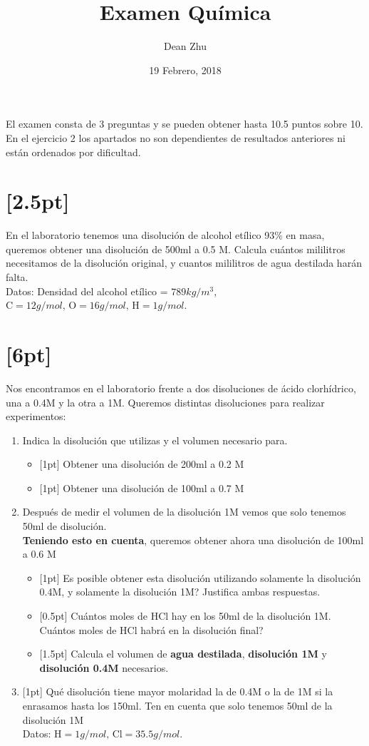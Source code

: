\documentclass[11pt]{article}
\date{19 Febrero, 2018}
\title{Examen Química}
\author{Dean Zhu}
\begin{document}
\maketitle
\thispagestyle{empty}
El examen consta de 3 preguntas y se pueden obtener hasta 10.5 puntos sobre 10. En el ejercicio 2 los apartados no son dependientes de resultados anteriores ni están ordenados por dificultad. 
\section{[2.5pt]}
\label{sec:org220dcd1}
En el laboratorio tenemos una disolución de alcohol etílico 93\% en masa, queremos obtener una disolución de 500ml a 0.5 M. Calcula cuántos mililitros necesitamos de la disolución original, y cuantos mililitros de agua destilada harán falta. \\
Datos: Densidad del alcohol etílico = \(789kg/m^{3}\), \(\text{C} = 12g/mol \text{, O} = 16g/mol \text{, H} = 1g/mol \).

\section{[6pt]}
\label{sec:org466d254}
Nos encontramos en el laboratorio frente a dos disoluciones de ácido clorhídrico, una a 0.4M y la otra a 1M. Queremos distintas disoluciones para realizar experimentos:
\begin{enumerate}[label=\Alph*)]
\item Indica la disolución que utilizas y el volumen necesario para.
    \begin{itemize}
    \item {[1pt]} Obtener una disolución de 200ml a 0.2 M
    \item {[1pt]} Obtener una disolución de 100ml a 0.7 M
    \end{itemize}
  \item Después de medir el volumen de la disolución 1M vemos que solo tenemos 50ml de disolución. \\
    \textbf{Teniendo esto en cuenta}, queremos obtener ahora una disolución de 100ml a 0.6 M
    \begin{itemize}
    \item {[1pt]} Es posible obtener esta disolución utilizando solamente la disolución 0.4M, y solamente la disolución 1M? Justifica ambas respuestas.
    \item {[0.5pt]} Cuántos moles de HCl hay en los 50ml de la disolución 1M. Cuántos moles de HCl habrá en la disolución final?
    \item {[1.5pt]} Calcula el volumen de \textbf{agua destilada}, \textbf{disolución 1M} y \textbf{disolución 0.4M} necesarios.  \\
    \end{itemize}
  \item {[1pt]} Qué disolución tiene mayor molaridad la de 0.4M o la de 1M si la enrasamos hasta los 150ml. Ten en cuenta que solo tenemos 50ml de la disolución 1M \\
      Datos: \(\text{H} = 1g/mol \text{, Cl} = 35.5g/mol \).
  \end{enumerate}
\end{document}
